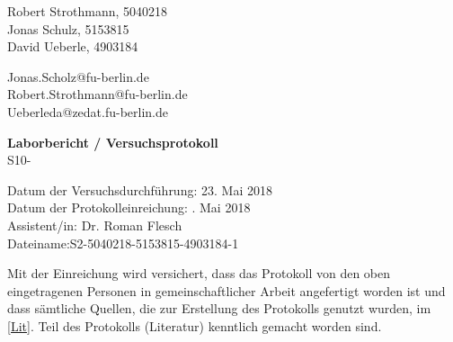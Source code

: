 %


%
\thispagestyle{empty}

\begin{flushleft}
Robert Strothmann, 5040218\\ 
Jonas Schulz, 5153815\\ 
David Ueberle, 4903184\\ 
\end{flushleft}
\vspace*{0.3cm}
Jonas.Scholz@fu-berlin.de\\
Robert.Strothmann@fu-berlin.de\\
Ueberleda@zedat.fu-berlin.de\\
\begin{center}
	\vspace*{1cm}
	\Large
	{ \bfseries Laborbericht / Versuchsprotokoll}\\
	\vspace*{1cm}
	{S10-}\\
\end{center}
	\vspace*{1cm}
	{Datum der Versuchsdurchführung: 23. Mai 2018}\\
	{Datum der Protokolleinreichung: . Mai 2018}\\
	{Assistent/in: Dr. Roman Flesch}\\
	{Dateiname:S2-5040218-5153815-4903184-1}	
	\vfill
\begin{flushleft}
Mit der Einreichung wird versichert, dass das Protokoll von den oben eingetragenen Personen in gemeinschaftlicher Arbeit angefertigt worden ist und dass sämtliche Quellen, die zur Erstellung des Protokolls genutzt wurden, im \ref{Lit}. Teil des Protokolls (Literatur) kenntlich gemacht worden sind.
\end{flushleft}

\normalsize
\newpage
%